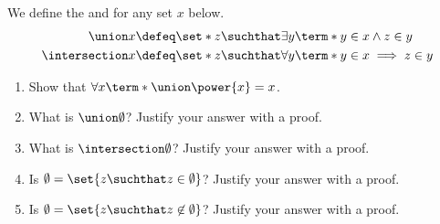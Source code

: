 \begin{enumerate}
    We define the  and  for any set $x$ below.
    \begin{align*}
      \union x &\defeq \set*{z \suchthat \exists y \term*{y \in x \land z \in y}} \\
      \intersection x &\defeq \set*{z \suchthat \forall y \term*{y \in x \implies z \in y}}
    \end{align*}
    \begin{enumerate}
      \item
        Show that $\forall x \term*{\union \power{x} = x}$.
      \item
        What is $\union \emptyset$?
        Justify your answer with a proof.
      \item
        What is $\intersection \emptyset$?
        Justify your answer with a proof.
      \item
        Is $\emptyset = \set{z \suchthat z \in \emptyset}$?
        Justify your answer with a proof.
      \item
        Is $\emptyset = \set{z \suchthat z \not \in \emptyset}$?
        Justify your answer with a proof.
    \end{enumerate}
\end{enumerate}


